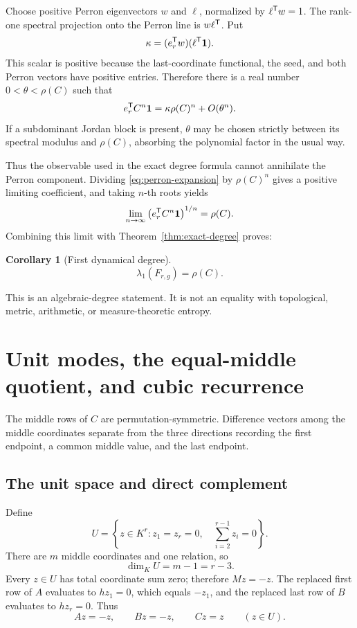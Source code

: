 \documentclass[11pt]{article}
\newtheorem{corollary}[theorem]{Corollary}
\theoremstyle{remark}
\numberwithin{equation}{section}
\begin{document}
Choose positive Perron eigenvectors \(w\) and \(\ell\), normalized by
\(\ell^{\mathsf{T}}w=1\).  The rank-one spectral projection onto the
Perron line is \(w\ell^{\mathsf{T}}\).  Put
\[
\kappa=(e_r^{\mathsf{T}}w)(\ell^{\mathsf{T}}\mathbf{1}).
\]
This scalar is positive because the last-coordinate functional, the seed,
and both Perron vectors have positive entries.  Therefore there is a real
number \(0<\theta<\rho(C)\) such that
\begin{equation}\label{eq:perron-expansion}
e_r^{\mathsf{T}}C^n\mathbf{1}
=
\kappa\rho(C)^n
+O(\theta^n).
\end{equation}
If a subdominant Jordan block is present, \(\theta\) may be chosen strictly
between its spectral modulus and \(\rho(C)\), absorbing the polynomial
factor in the usual way.

Thus the observable used in the exact degree formula cannot annihilate the
Perron component.  Dividing
\eqref{eq:perron-expansion} by \(\rho(C)^n\) gives a positive limiting
coefficient, and taking \(n\)-th roots yields
\[
\lim_{n\to\infty}
\left(e_r^{\mathsf{T}}C^n\mathbf{1}\right)^{1/n}
=\rho(C).
\]
Combining this limit with Theorem~\ref{thm:exact-degree} proves:

\begin{corollary}[First dynamical degree]\label{cor:perron}
\begin{equation}\label{eq:lambda-rho}
\lambda_1(F_{r,g})=\rho(C).
\end{equation}
\end{corollary}

This is an algebraic-degree statement.  It is not an equality with
topological, metric, arithmetic, or measure-theoretic entropy.

\section{Unit modes, the equal-middle quotient, and cubic recurrence}\label{sec:cubic}

The middle rows of \(C\) are permutation-symmetric.  Difference vectors
among the middle coordinates separate from the three directions recording
the first endpoint, a common middle value, and the last endpoint.

\subsection{The unit space and direct complement}

Define
\begin{equation}\label{eq:U-def}
U=\left\{z\in K^r:z_1=z_r=0,\quad
\sum_{i=2}^{r-1}z_i=0\right\}.
\end{equation}
There are \(m\) middle coordinates and one relation, so
\begin{equation}\label{eq:U-dim}
\dim_K U=m-1=r-3.
\end{equation}
Every \(z\in U\) has total coordinate sum zero; therefore
\(Mz=-z\).  The replaced first row of \(A\) evaluates to \(hz_1=0\),
which equals \(-z_1\), and the replaced last row of \(B\) evaluates to
\(hz_r=0\).  Thus
\begin{equation}\label{eq:U-actions}
Az=-z,\qquad Bz=-z,\qquad Cz=z\qquad(z\in U).
\end{equation}
\end{document}
